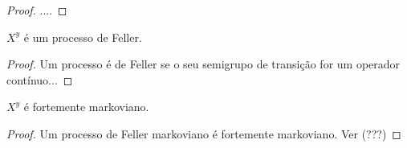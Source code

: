\begin{proof}
  ....
\end{proof}

\begin{proposicao}
  \label{prop:proc_feller}
  $X^y$ é um processo de Feller.
\end{proposicao}
\begin{proof}
  Um processo é de Feller se o seu semigrupo de transição for um
  operador contínuo...
\end{proof}



\begin{corolario}
  \label{cor:proc_fort_markov}
  $X^y$ é fortemente markoviano.
\end{corolario}
\begin{proof}
  Um processo de Feller markoviano é fortemente markoviano. Ver (???)
\end{proof}



